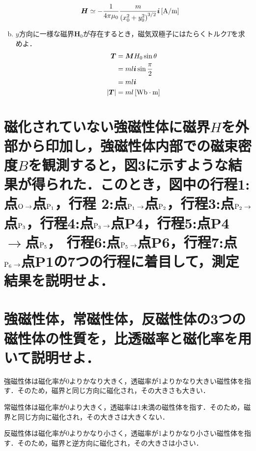 \documentclass[dvipdfmx]{ujarticle}
\begin{document}
\begin{enumerate}[(a)]
	\begin{align*}
		\boldsymbol{H}&\simeq -\frac{1}{4\pi \mu_{0}}\frac{m}{\left(x_{0}^{2}+y_{0}^{2}\right)^{3/2}} \boldsymbol{i}\,[\rm{A/m}]
	\end{align*}
	\item $y$方向に一様な磁界$\boldsymbol{H}_{0}$が存在するとき，磁気双極子にはたらくトルク$T$を求めよ．
	\begin{align*}
		\boldsymbol{T}&=\boldsymbol{M}H_{0}\sin \theta \\
		&=ml\boldsymbol{i}\sin \frac{\pi}{2}\\
		&=ml\boldsymbol{i}\\
		|\boldsymbol{T}|&=ml\,[\rm{Wb\cdot m}]
	\end{align*}
\end{enumerate}

\section{磁化されていない強磁性体に磁界$H$を外部から印加し，強磁性体内部での磁束密度$B$を観測すると，図3に示すような結果が得られた．このとき，図中の行程1:点$\rm{O}\to$点$\rm{P_{1}}$，行程 2:点$\rm{P_{1}}\to$点$\rm{P_{2}}$，行程3:点$\rm{P_{2}}\to$点$\rm{P_{3}}$，行程4:点$\rm{P_{3}}\to$点P4，行程5:点P4 $\to$点$\rm{P_{5}}$， 行程6:点$\rm{P_{5}}\to$点P6，行程7:点$\rm{P_{6}}\to$点P1の7つの行程に着目して，測定結果を説明せよ．}

\section{強磁性体，常磁性体，反磁性体の3つの磁性体の性質を，比透磁率と磁化率を用いて説明せよ．}
強磁性体は磁化率が0よりかなり大きく，透磁率が1よりかなり大きい磁性体を指す．そのため，磁界と同じ方向に磁化され，その大きさも大きい．

常磁性体は磁化率が0より大きく，透磁率は1未満の磁性体を指す．そのため，磁界と同じ方向に磁化され，その大きさは大きくない．

反磁性体は磁化率が0よりかなり小さく，透磁率が1よりかなり小さい磁性体を指す．そのため，磁界と逆方向に磁化され，その大きさは小さい．
\end{document}
